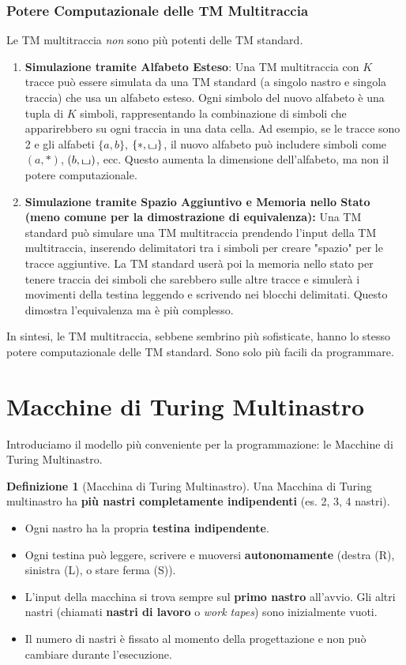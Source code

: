 \documentclass[a4paper]{article}
\theoremstyle{definition} %
\newtheorem{definition}{Definizione}
\newcommand{\blankS}{\ensuremath{\raisebox{-0.15ex}{\scalebox{1.3}[0.7]{$\sqcup$}}}}
\begin{document}
\subsubsection{Potere Computazionale delle TM Multitraccia}
Le TM multitraccia \emph{non} sono più potenti delle TM standard.
\begin{enumerate}
    \item \textbf{Simulazione tramite Alfabeto Esteso}:
    Una TM multitraccia con $K$ tracce può essere simulata da una TM standard (a singolo nastro e singola traccia) che usa un alfabeto esteso. Ogni simbolo del nuovo alfabeto è una tupla di $K$ simboli, rappresentando la combinazione di simboli che apparirebbero su ogni traccia in una data cella. Ad esempio, se le tracce sono 2 e gli alfabeti $\{a,b\}$, $\{*, \blankS\}$, il nuovo alfabeto può includere simboli come $(a, *)$, $(b, \blankS)$, ecc. Questo aumenta la dimensione dell'alfabeto, ma non il potere computazionale.
    \item \textbf{Simulazione tramite Spazio Aggiuntivo e Memoria nello Stato (meno comune per la dimostrazione di equivalenza):}
    Una TM standard può simulare una TM multitraccia prendendo l'input della TM multitraccia, inserendo delimitatori tra i simboli per creare "spazio" per le tracce aggiuntive. La TM standard userà poi la memoria nello stato per tenere traccia dei simboli che sarebbero sulle altre tracce e simulerà i movimenti della testina leggendo e scrivendo nei blocchi delimitati. Questo dimostra l'equivalenza ma è più complesso.
\end{enumerate}
In sintesi, le TM multitraccia, sebbene sembrino più sofisticate, hanno lo stesso potere computazionale delle TM standard. Sono solo più facili da programmare.

\section{Macchine di Turing Multinastro}
Introduciamo il modello più conveniente per la programmazione: le Macchine di Turing Multinastro.

\begin{definition}[Macchina di Turing Multinastro]
Una Macchina di Turing multinastro ha \textbf{più nastri completamente indipendenti} (es. 2, 3, 4 nastri).
\begin{itemize}
    \item Ogni nastro ha la propria \textbf{testina indipendente}.
    \item Ogni testina può leggere, scrivere e muoversi \textbf{autonomamente} (destra (R), sinistra (L), o stare ferma (S)).
    \item L'input della macchina si trova sempre sul \textbf{primo nastro} all'avvio. Gli altri nastri (chiamati \textbf{nastri di lavoro} o \emph{work tapes}) sono inizialmente vuoti.
    \item Il numero di nastri è fissato al momento della progettazione e non può cambiare durante l'esecuzione.
\end{itemize}
\end{definition}
\end{document}
